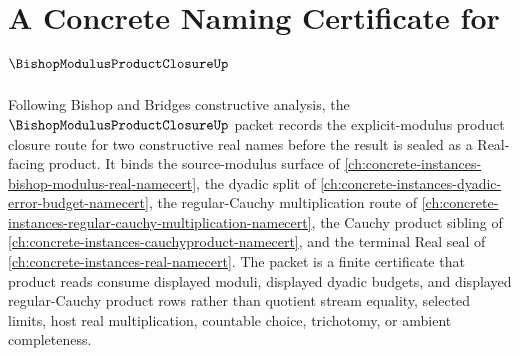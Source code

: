 \chapter{A Concrete Naming Certificate for $\BishopModulusProductClosureUp$}
\label{ch:concrete-instances-bishop-modulus-product-closure-namecert}

Following Bishop and Bridges constructive analysis, the $\BishopModulusProductClosureUp$ packet records the explicit-modulus product closure route for two constructive real names before the result is sealed as a Real-facing product. It binds the source-modulus surface of \autoref{ch:concrete-instances-bishop-modulus-real-namecert}, the dyadic split of \autoref{ch:concrete-instances-dyadic-error-budget-namecert}, the regular-Cauchy multiplication route of \autoref{ch:concrete-instances-regular-cauchy-multiplication-namecert}, the Cauchy product sibling of \autoref{ch:concrete-instances-cauchyproduct-namecert}, and the terminal Real seal of \autoref{ch:concrete-instances-real-namecert}. The packet is a finite certificate that product reads consume displayed moduli, displayed dyadic budgets, and displayed regular-Cauchy product rows rather than quotient stream equality, selected limits, host real multiplication, countable choice, trichotomy, or ambient completeness.

